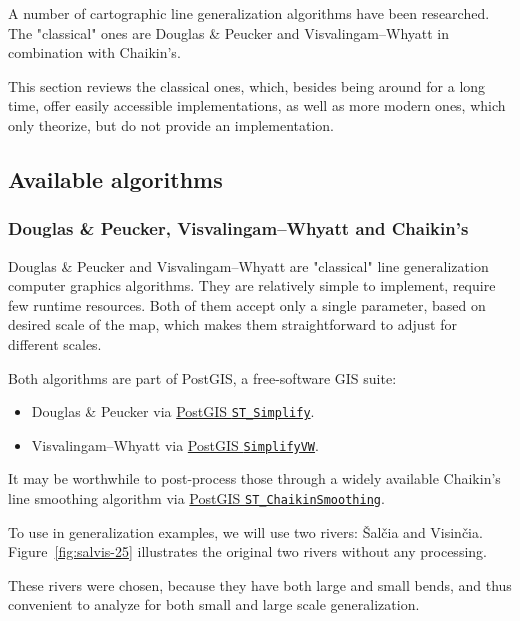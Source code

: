 \documentclass[a4paper]{article}
\newcommand{\DP}{Douglas \& Peucker}
\newcommand{\VW}{Visvalingam--Whyatt}
\begin{document}
A number of cartographic line generalization algorithms have been researched.
The "classical" ones are {\DP}\cite{douglas1973algorithms} and
{\VW}\cite{visvalingam1993line} in combination with
Chaikin's\cite{chaikin1974algorithm}.

This section reviews the classical ones, which, besides being around for a long
time, offer easily accessible implementations, as well as more modern ones,
which only theorize, but do not provide an implementation.

\subsection{Available algorithms}

\subsubsection{{\DP}, {\VW} and Chaikin's}

{\DP}\cite{douglas1973algorithms} and {\VW}\cite{visvalingam1993line} are
"classical" line generalization computer graphics algorithms. They are
relatively simple to implement, require few runtime resources. Both of them
accept only a single parameter, based on desired scale of the map, which makes
them straightforward to adjust for different scales.

Both algorithms are part of PostGIS, a free-software GIS suite:
\begin{itemize}
    \item {\DP} via
        \href{https://postgis.net/docs/ST_Simplify.html}{PostGIS \texttt{ST\_Simplify}}.

    \item {\VW} via
        \href{https://postgis.net/docs/ST_SimplifyVW.html}{PostGIS \texttt{SimplifyVW}}.
\end{itemize}

It may be worthwhile to post-process those through a widely available Chaikin's
line smoothing algorithm\cite{chaikin1974algorithm} via
\href{https://postgis.net/docs/ST_ChaikinSmoothing.html}{PostGIS
\texttt{ST\_ChaikinSmoothing}}.

To use in generalization examples, we will use two rivers: Šalčia and Visinčia.
Figure~\ref{fig:salvis-25} illustrates the original two rivers without any
processing.

These rivers were chosen, because they have both large and small bends, and
thus convenient to analyze for both small and large scale generalization.
\end{document}
